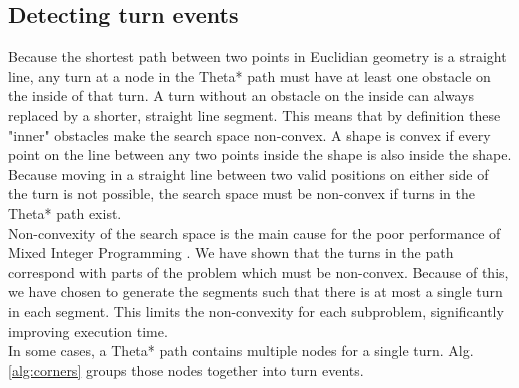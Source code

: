 \subsection{Detecting turn events}
Because the shortest path between two points in Euclidian geometry is a straight line, any turn at a node in the Theta* path must have at least one obstacle on the inside of that turn. A turn without an obstacle on the inside can always replaced by a shorter, straight line segment. This means that by definition these "inner" obstacles make the search space non-convex. A shape is convex if every point on the line between any two points inside the shape is also inside the shape. Because moving in a straight line between two valid positions on either side of the turn is not possible, the search space must be non-convex if turns in the Theta* path exist.\\
Non-convexity of the search space is the main cause for the poor performance of Mixed Integer Programming \cite{Deits2015}. We have shown that the turns in the path correspond with parts of the problem which must be non-convex. Because of this, we have chosen to generate the segments such that there is at most a single turn in each segment. This limits the non-convexity for each subproblem, significantly improving execution time.\\
In some cases, a Theta* path contains multiple nodes for a single turn. Alg. \ref{alg:corners} groups those nodes together into turn events.

